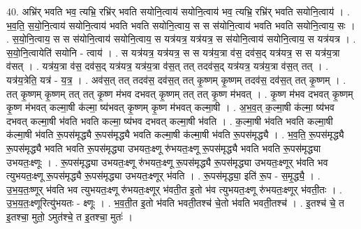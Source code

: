 \documentclass[17pt]{extarticle}
\begin{document}
40. अभ्रि॑र् भवति भव॒ त्यभ्रि॒ रभ्रि॑र् भवति सयोनि॒त्वाय॑ सयोनि॒त्वाय॑ भव॒ त्यभ्रि॒ रभ्रि॑र् भवति सयोनि॒त्वाय॑ । . भ॒व॒ति॒ स॒यो॒नि॒त्वाय॑ सयोनि॒त्वाय॑ भवति भवति सयोनि॒त्वाय॒ स स स॑योनि॒त्वाय॑ भवति भवति सयोनि॒त्वाय॒ सः । . स॒यो॒नि॒त्वाय॒ स स स॑योनि॒त्वाय॑ सयोनि॒त्वाय॒ स यत्र॑यत्र॒ यत्र॑यत्र॒ स स॑योनि॒त्वाय॑ सयोनि॒त्वाय॒ स यत्र॑यत्र । . स॒यो॒नि॒त्वायेति॑ सयोनि - त्वाय॑ । . स यत्र॑यत्र॒ यत्र॑यत्र॒ स स यत्र॑य॒त्रा व॑स॒ दव॑स॒द् यत्र॑यत्र॒ स स यत्र॑य॒त्रा व॑सत् । . यत्र॑य॒त्रा व॑स॒ दव॑स॒द् यत्र॑यत्र॒ यत्र॑य॒त्रा व॑स॒त् तत् तदव॑स॒द् यत्र॑यत्र॒ यत्र॑य॒त्रा व॑स॒त् तत् । . यत्र॑य॒त्रेति॒ यत्र॑ - य॒त्र॒ । . अव॑स॒त् तत् तदव॑स॒ दव॑स॒त् तत् कृ॒ष्णम् कृ॒ष्णम् तदव॑स॒ दव॑स॒त् तत् कृ॒ष्णम् । . तत् कृ॒ष्णम् कृ॒ष्णम् तत् तत् कृ॒ष्ण म॑भव दभवत् कृ॒ष्णम् तत् तत् कृ॒ष्ण म॑भवत् । . कृ॒ष्ण म॑भव दभवत् कृ॒ष्णम् कृ॒ष्ण म॑भवत् कल्मा॒षी क॑ल्मा॒ ष्य॑भवत् कृ॒ष्णम् कृ॒ष्ण म॑भवत् कल्मा॒षी । . अ॒भ॒व॒त् क॒ल्मा॒षी क॑ल्मा॒ ष्य॑भव दभवत् कल्मा॒षी भ॑वति भवति कल्मा॒ ष्य॑भव दभवत् कल्मा॒षी भ॑वति । . क॒ल्मा॒षी भ॑वति भवति कल्मा॒षी क॑ल्मा॒षी भ॑वति रू॒पस॑मृद्ध्यै रू॒पस॑मृद्ध्यै भवति कल्मा॒षी क॑ल्मा॒षी भ॑वति रू॒पस॑मृद्ध्यै । . भ॒व॒ति॒ रू॒पस॑मृद्ध्यै रू॒पस॑मृद्ध्यै भवति भवति रू॒पस॑मृद्ध्या उभयतः॒क्ष्णू 
रु॑भयतः॒क्ष्णू रू॒पस॑मृद्ध्यै भवति भवति रू॒पस॑मृद्ध्या उभयतः॒क्ष्णूः । . रू॒पस॑मृद्ध्या उभयतः॒क्ष्णू रु॑भयतः॒क्ष्णू रू॒पस॑मृद्ध्यै रू॒पस॑मृद्ध्या उभयतः॒क्ष्णूर् भ॑वति भव त्युभयतः॒क्ष्णू रू॒पस॑मृद्ध्यै रू॒पस॑मृद्ध्या उभयतः॒क्ष्णूर् भ॑वति । . रू॒पस॑मृद्ध्या॒ इति॑ रू॒प - स॒मृ॒द्ध्यै॒ । . उ॒भ॒य॒तः॒ष्णूर् भ॑वति भव त्युभयतः॒क्ष्णू रु॑भयतः॒क्ष्णूर् भ॑वती॒त इ॒तो भ॑व त्युभयतः॒क्ष्णू रु॑भयतः॒क्ष्णूर् भ॑वती॒तः । . उ॒भ॒य॒तः॒क्ष्णूरित्यु॑भयतः - क्ष्णूः । . भ॒व॒ती॒त इ॒तो भ॑वति भवती॒तश्च॑ चे॒तो भ॑वति भवती॒तश्च॑ । . इ॒तश्च॑ चे॒ त इ॒तश्चा॒ मुतो॒ ऽमुत॑श्चे॒ त इ॒तश्चा॒ मुतः॑ । \newline
\end{document}
